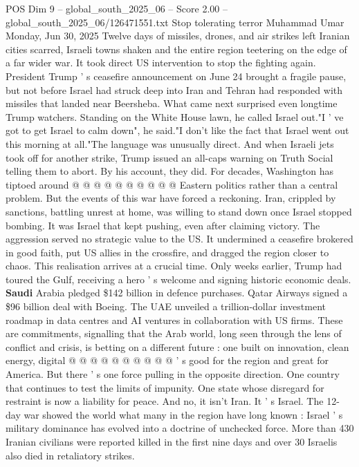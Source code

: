 \begin{textsample}{POS Dim 9 – global\_south\_2025\_06 – Score 2.00 – global\_south\_2025\_06/126471551.txt}  \label{ex:f9_pos_187}
Stop tolerating terror Muhammad Umar Monday, Jun 30, 2025 Twelve days of missiles, drones, and air strikes left Iranian cities scarred, Israeli towns shaken and the entire region teetering on the edge of a far wider war.
It took direct US intervention to stop the fighting again.
President Trump ' s ceasefire announcement on June 24 brought a fragile pause, but not before Israel had struck deep into Iran and Tehran had responded with missiles that landed near Beersheba.
What came next surprised even longtime Trump watchers.
Standing on the White House lawn, he called Israel out."I ' ve got to get Israel to calm down", he said."I don't like the fact that Israel went out this morning at all."The language was unusually direct.
And when Israeli jets took off for another strike, Trump issued an all-caps warning on Truth Social telling them to abort.
By his account, they did.
For decades, Washington has tiptoed around @ @ @ @ @ @ @ @ @ @ Eastern politics rather than a central problem.
But the events of this war have forced a reckoning.
Iran, crippled by sanctions, battling unrest at home, was willing to stand down once Israel stopped bombing.
It was Israel that kept pushing, even after claiming victory.
The aggression served no strategic value to the US.
It undermined a ceasefire brokered in good faith, put US allies in the crossfire, and dragged the region closer to chaos.
This realisation arrives at a crucial time.
Only weeks earlier, Trump had toured the Gulf, receiving a hero ' s welcome and signing historic economic deals. \textbf{Saudi} Arabia pledged \$142 billion in defence purchases.
Qatar Airways signed a \$96 billion deal with Boeing.
The UAE unveiled a trillion-dollar investment roadmap in data centres and AI ventures in collaboration with US firms.
These are commitments, signalling that the Arab world, long seen through the lens of conflict and crisis, is betting on a different future : one built on innovation, clean energy, digital @ @ @ @ @ @ @ @ @ @ ' s good for the region and great for America.
But there ' s one force pulling in the opposite direction.
One country that continues to test the limits of impunity.
One state whose disregard for restraint is now a liability for peace.
And no, it isn't Iran.
It ' s Israel.
The 12-day war showed the world what many in the region have long known : Israel ' s military dominance has evolved into a doctrine of unchecked force.
More than 430 Iranian civilians were reported killed in the first nine days and over 30 Israelis also died in retaliatory strikes.

\end{textsample}
